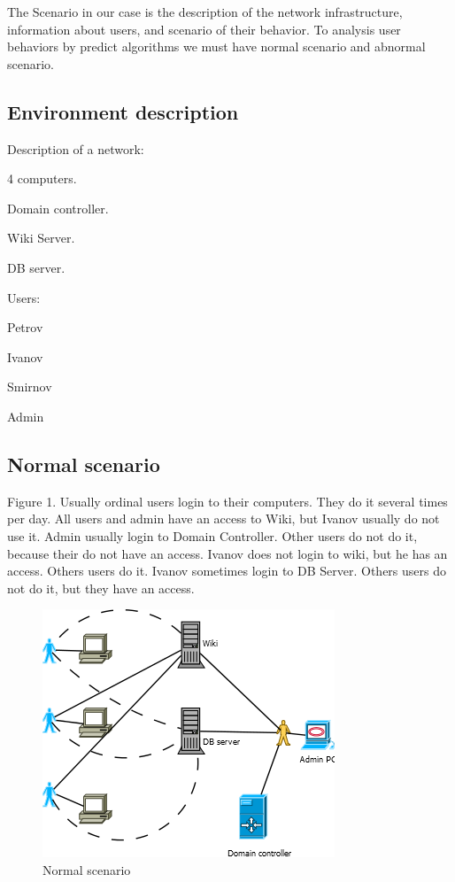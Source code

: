 \documentclass[twoside]{article}
\begin{document}
The Scenario in our case is the description of the network infrastructure, information about users, and scenario of their behavior. To analysis user behaviors by predict algorithms we must have normal scenario and abnormal scenario.  
  
\subsection{Environment description}

Description of a network:
\begin{compactitem}
\item 4 computers.
\item Domain controller. 
\item Wiki Server.
\item DB server.
\end{compactitem}
Users: 
\begin{compactitem}
\item Petrov
\item Ivanov 
\item Smirnov
\item Admin
\end{compactitem}
     
\subsection{Normal scenario}
Figure 1. Usually ordinal users login to their computers. They do it several times per day. All users and admin have an access to Wiki, but Ivanov usually do not use it. Admin usually login to Domain Controller. Other users do not do it, because their do not have an access. Ivanov does not login to wiki, but he has an access. Others users do it. Ivanov sometimes login to DB Server. Others users do not do it, but they have an access.
\begin{figure}[ht!]
\centering
\includegraphics{scenario_normal.png}
\caption{Normal scenario}
\label{overflow}
\end{figure}
\end{document}

